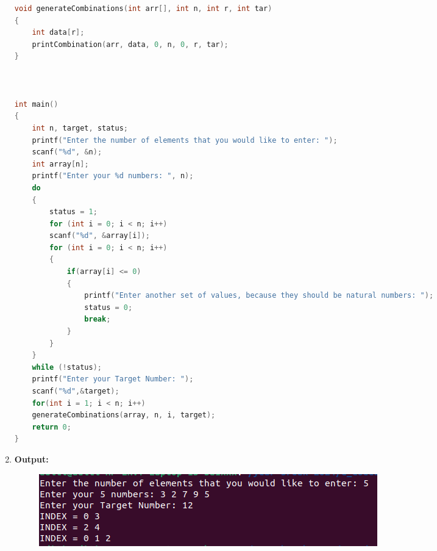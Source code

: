 \begin{enumerate}
\begin{lstlisting}[language=C]
void generateCombinations(int arr[], int n, int r, int tar) 
{
    int data[r]; 
    printCombination(arr, data, 0, n, 0, r, tar);
}



int main()
{
    int n, target, status;
	printf("Enter the number of elements that you would like to enter: ");
    scanf("%d", &n);
    int array[n];
    printf("Enter your %d numbers: ", n);
    do 
    {
    	status = 1;
    	for (int i = 0; i < n; i++)
    	scanf("%d", &array[i]);  	
    	for (int i = 0; i < n; i++)
    	{
    		if(array[i] <= 0) 
    		{
    			printf("Enter another set of values, because they should be natural numbers: ");
    			status = 0;
    			break;
    		}
    	}
    }
    while (!status);
    printf("Enter your Target Number: ");
    scanf("%d",&target);    
    for(int i = 1; i < n; i++)
    generateCombinations(array, n, i, target); 
    return 0;
}
\end{lstlisting}
    \item \textbf{Output: }
    \begin{figure}[H]
    \includegraphics[scale = 0.5]{./figs/two_sum_adv.png}
    \end{figure}
    
\end{enumerate}
